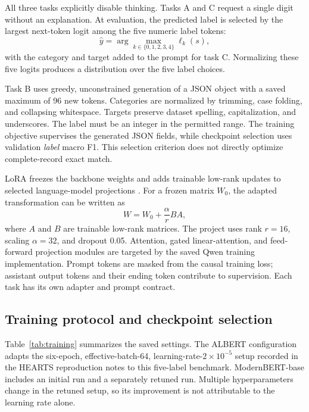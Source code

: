 All three tasks explicitly disable thinking. Tasks A and C request a single digit without an explanation. At evaluation, the predicted label is selected by the largest next-token logit among the five numeric label tokens:
\begin{equation}
\hat y=\arg\max_{k\in\{0,1,2,3,4\}}\ell_k(s),
\end{equation}
with the category and target added to the prompt for task C. Normalizing these five logits produces a distribution over the five label choices.

Task B uses greedy, unconstrained generation of a JSON object with a saved maximum of 96 new tokens. Categories are normalized by trimming, case folding, and collapsing whitespace. Targets preserve dataset spelling, capitalization, and underscores. The label must be an integer in the permitted range. The training objective supervises the generated JSON fields, while checkpoint selection uses validation \emph{label} macro F1. This selection criterion does not directly optimize complete-record exact match.

LoRA freezes the backbone weights and adds trainable low-rank updates to selected language-model projections \citep{hu2022}. For a frozen matrix $W_0$, the adapted transformation can be written as
\begin{equation}
W=W_0+\frac{\alpha}{r}BA,
\end{equation}
where $A$ and $B$ are trainable low-rank matrices. The project uses rank $r=16$, scaling $\alpha=32$, and dropout 0.05. Attention, gated linear-attention, and feed-forward projection modules are targeted by the saved Qwen training implementation. Prompt tokens are masked from the causal training loss; assistant output tokens and their ending token contribute to supervision. Each task has its own adapter and prompt contract.

\subsection{Training protocol and checkpoint selection}
Table~\ref{tab:training} summarizes the saved settings. The ALBERT configuration adapts the six-epoch, effective-batch-64, learning-rate-$2\times10^{-5}$ setup recorded in the HEARTS reproduction notes to this five-label benchmark. ModernBERT-base includes an initial run and a separately retuned run. Multiple hyperparameters change in the retuned setup, so its improvement is not attributable to the learning rate alone.

